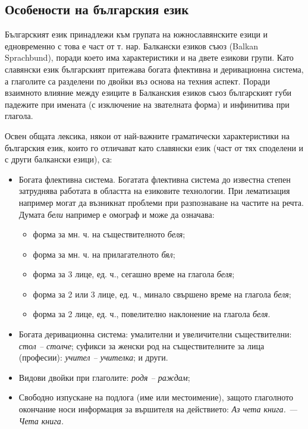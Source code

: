 \documentclass[]{../../metanetpaper}
\begin{document}
\begin{multicols}{2}
\subsection{Особености на българския език}

Българският език принадлежи към групата на южнославянските езици и едновременно с това е част от
 т. нар. Балкански езиков съюз (Balkan Sprachbund), поради което има характеристики и на двете езикови групи. Като славянски език българският притежава богата флективна и деривационна система, а глаголите са
 разделени по двойки въз основа на техния аспект. Поради взаимното влияние между езиците в Балканския езиков съюз българският губи падежите при
 имената (с изключение на звателната форма) и
 инфинитива при глагола.


Освен общата лексика, някои от най-важните граматически характеристики на българския език, които го отличават като славянски език (част от тях споделени и с други балкански езици), са:

\begin{itemize}
\item Богата флективна система. Богатата флективна
система до известна степен затруднява работата в областта на
 езиковите технологии.
 При лематизация например могат да възникнат
 проблеми при разпознаване
 на
 частите на речта. Думата \textit{бели} например е омограф и
 може да означава: 

\begin{itemize}
\item форма за мн. ч. на съществителното \textit{беля};
\item форма за мн. ч. на прилагателното \textit{бял};
\item форма за 3 лице, ед. ч., сегашно време на глагола
 \textit{беля};
\item форма за 2 или 3 лице, ед. ч., минало свършено време
 на глагола \textit{беля};
\item форма за 2 лице, ед. ч., повелително наклонение на
 глагола \textit{беля}.
\end{itemize}

\item Богата деривационна система: умалителни и увеличителни съществителни: {\it стол – столче}; суфикси
 за женски род на съществителните за лица (професии): {\it учител – учителка}; и други.
\item Видови двойки при глаголите: {\it родя – раждам};
\item Свободно изпускане на подлога (име или местоимение), защото глаголното окончание носи информация за вършителя на действието: \textit{Аз чета книга. — Чета книга.}
\end{itemize}


\end{multicols}
\end{document}
